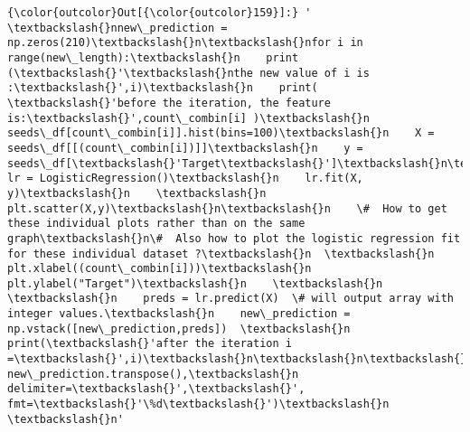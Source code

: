 \documentclass[11pt]{article}
\begin{document}
\begin{Verbatim}[commandchars=\\\{\}]
{\color{outcolor}Out[{\color{outcolor}159}]:} ' \textbackslash{}nnew\_prediction = np.zeros(210)\textbackslash{}n\textbackslash{}nfor i in range(new\_length):\textbackslash{}n    print (\textbackslash{}'\textbackslash{}nthe new value of i is :\textbackslash{}',i)\textbackslash{}n    print( \textbackslash{}'before the iteration, the feature is:\textbackslash{}',count\_combin[i] )\textbackslash{}n    seeds\_df[count\_combin[i]].hist(bins=100)\textbackslash{}n    X = seeds\_df[[(count\_combin[i])]]\textbackslash{}n    y = seeds\_df[\textbackslash{}'Target\textbackslash{}']\textbackslash{}n\textbackslash{}n    lr = LogisticRegression()\textbackslash{}n    lr.fit(X, y)\textbackslash{}n    \textbackslash{}n    plt.scatter(X,y)\textbackslash{}n\textbackslash{}n    \#  How to get these individual plots rather than on the same graph\textbackslash{}n\#  Also how to plot the logistic regression fit for these individual dataset ?\textbackslash{}n  \textbackslash{}n    plt.xlabel((count\_combin[i]))\textbackslash{}n    plt.ylabel("Target")\textbackslash{}n    \textbackslash{}n    \textbackslash{}n    preds = lr.predict(X)  \# will output array with integer values.\textbackslash{}n    new\_prediction = np.vstack([new\_prediction,preds])  \textbackslash{}n    print(\textbackslash{}'after the iteration i =\textbackslash{}',i)\textbackslash{}n\textbackslash{}n\textbackslash{}ndisplay(new\_prediction)\textbackslash{}n\textbackslash{}nnp.savetxt(\textbackslash{}'output\_1\_individual\_predictors.csv\textbackslash{}', new\_prediction.transpose(),\textbackslash{}n                                           delimiter=\textbackslash{}',\textbackslash{}', fmt=\textbackslash{}'\%d\textbackslash{}')\textbackslash{}n                                           \textbackslash{}n'
\end{Verbatim}
            

    
    
    
    
\end{document}
